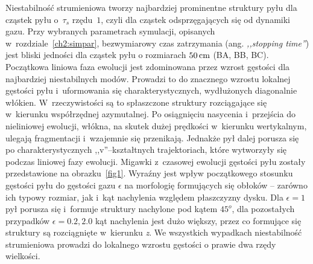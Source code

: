Niestabilność strumieniowa tworzy najbardziej prominentne struktury pyłu dla
cząstek pyłu o~$\tau_s$ rzędu~$1$, czyli dla cząstek odsprzęgających się od
dynamiki gazu.
Przy wybranych parametrach symulacji, opisanych w~rozdziale~\ref{ch2:simpar},
bezwymiarowy czas zatrzymania (ang. \emph{,,stopping time''}) jest bliski
jedności dla cząstek pyłu o rozmiarach $50\hbox{$\thinspace\textrm{cm}$}$ (BA, BB, BC). Początkowa liniowa
faza ewolucji jest zdominowana przez wzrost gęstości dla najbardziej
niestabilnych modów. Prowadzi to do znacznego wzrostu lokalnej gęstości pyłu
i~uformowania się charakterystycznych, wydłużonych diagonalnie włókien.
W~rzeczywistości są to spłaszczone struktury rozciągające się w~kierunku
współrzędnej azymutalnej. Po osiągnięciu nasycenia i~przejścia do nieliniowej
ewolucji, włókna, na skutek dużej prędkości w~kierunku wertykalnym, ulegają
fragmentacji i~wzajemnie się przenikają. Jednakże pył dalej porusza się po
charakterystycznych ,,v''--kształtnych trajektoriach, które wytworzyły się
podczas liniowej fazy ewolucji. Migawki z~czasowej ewolucji gęstości pyłu
zostały przedstawione na obrazku~\ref{fig1}. Wyraźny jest wpływ początkowego
stosunku gęstości pyłu do gęstości gazu $\epsilon$ na morfologię formujących się
obłoków -- zarówno ich typowy rozmiar, jak i~kąt nachylenia względem płaszczyzny
dysku. Dla $\epsilon = 1$ pył porusza się i~formuje struktury nachylone pod
kątem $45^o$, dla pozostałych przypadków $\epsilon=0.2, 2.0$ kąt nachylenia jest
dużo większy, przez co formujące się struktury są rozciągnięte w~kierunku
\emph{z}. We wszystkich wypadkach niestabilność strumieniowa prowadzi do
lokalnego wzrostu gęstości o prawie dwa rzędy wielkości.

